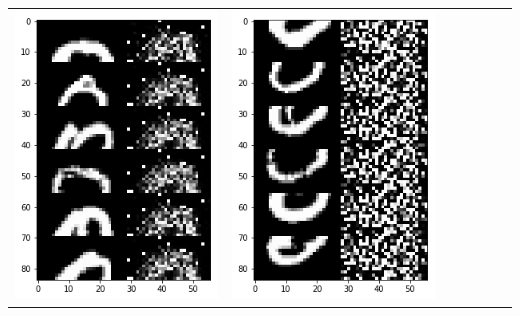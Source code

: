 \documentclass[12pt]{report} %
\begin{document}
\begin{tabular}{m{0.7cm}m{2.4cm}m{2.4cm}m{2.4cm}m{2.4cm}m{2.4cm}m{2.4cm}}
	\includegraphics[scale=0.3]{pictures/M2_0_up.png} & \includegraphics[scale=0.3]{pictures/M2_0_down.png}\\

\end{tabular}
\end{document}
